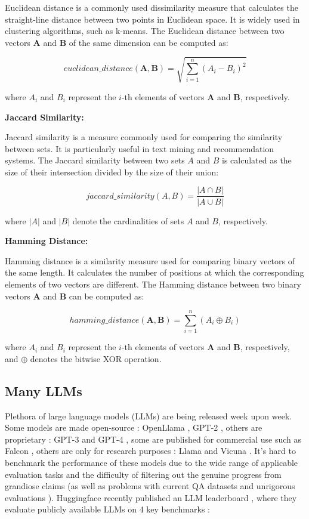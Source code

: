 \documentclass[a4paper,12pt]{article}
\begin{document}
Euclidean distance is a commonly used dissimilarity measure that calculates the straight-line distance between two points in Euclidean space. It is widely used in clustering algorithms, such as k-means. The Euclidean distance between two vectors $\mathbf{A}$ and $\mathbf{B}$ of the same dimension can be computed as:

$$
euclidean\_distance(\mathbf{A}, \mathbf{B}) = \sqrt{\sum_{i=1}^{n} (A_i - B_i)^2}
$$

where $A_i$ and $B_i$ represent the $i$-th elements of vectors $\mathbf{A}$ and $\mathbf{B}$, respectively.

\textbf{Jaccard Similarity:}

Jaccard similarity \cite{jaccard} is a measure commonly used for comparing the similarity between sets. It is particularly useful in text mining and recommendation systems. The Jaccard similarity between two sets $A$ and $B$ is calculated as the size of their intersection divided by the size of their union:

$$
jaccard\_similarity(A, B) = \frac{|A \cap B|}{|A \cup B|}
$$

where $|A|$ and $|B|$ denote the cardinalities of sets $A$ and $B$, respectively.

\textbf{Hamming Distance:}

Hamming distance \cite{hamming} is a similarity measure used for comparing binary vectors of the same length. It calculates the number of positions at which the corresponding elements of two vectors are different. The Hamming distance between two binary vectors $\mathbf{A}$ and $\mathbf{B}$ can be computed as:

$$
hamming\_distance(\mathbf{A}, \mathbf{B}) = \sum_{i=1}^{n} (A_i \oplus B_i)
$$

where $A_i$ and $B_i$ represent the $i$-th elements of vectors $\mathbf{A}$ and $\mathbf{B}$, respectively, and $\oplus$ denotes the bitwise XOR operation.

\subsection{Many LLMs}
Plethora of large language models (LLMs) are being released week upon week. Some models are made open-source : OpenLlama \cite{openllama}, GPT-2 \cite{gpt2}, others are proprietary : GPT-3\cite{gpt3} and GPT-4 \cite{gpt4}, some are published for commercial use such as Falcon \cite{falcon}, others are only for research purposes : Llama \cite{llama} and Vicuna \cite{vicuna}.
It's hard to benchmark the performance of these models due to the wide range of applicable evaluation tasks and the difficulty of filtering out the genuine progress from grandiose claims (as well as problems with current QA datasets and unrigorous evaluations \cite{unfairdataset}).
Huggingface recently published an LLM leaderboard \cite{open-llm-leaderboard}, where they evaluate publicly available LLMs on 4 key benchmarks : 
\end{document}
